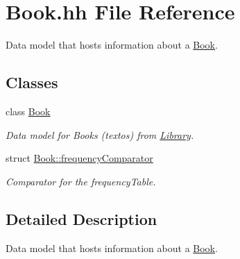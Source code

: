 \hypertarget{_book_8hh}{}\section{Book.\+hh File Reference}
\label{_book_8hh}


Data model that hosts information about a \hyperlink{class_book}{Book}.  


\subsection*{Classes}
\begin{DoxyCompactItemize}
\item 
class \hyperlink{class_book}{Book}
\begin{DoxyCompactList}\small\item\em Data model for Books (textos) from \hyperlink{class_library}{Library}. \end{DoxyCompactList}\item 
struct \hyperlink{struct_book_1_1frequency_comparator}{Book\+::frequency\+Comparator}
\begin{DoxyCompactList}\small\item\em Comparator for the frequency\+Table. \end{DoxyCompactList}\end{DoxyCompactItemize}


\subsection{Detailed Description}
Data model that hosts information about a \hyperlink{class_book}{Book}. 

